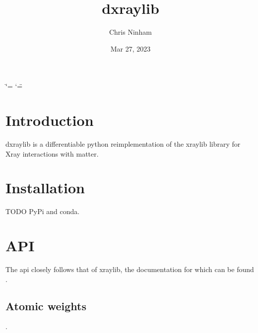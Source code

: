 \documentclass[letterpaper,10pt,english,openany,oneside]{sphinxmanual}
\title{dxraylib}
\date{Mar 27, 2023}
\author{Chris Ninham}
\begin{document}
\ifdefined\shorthandoff
  \ifnum\catcode`\=\string=\active\shorthandoff{=}\fi
  \ifnum\catcode`\"=\active{}\fi
\fi

\pagestyle{empty}
\sphinxmaketitle
\pagestyle{plain}
\sphinxtableofcontents
\pagestyle{normal}
\label{\detokenize{index::doc}}


\sphinxstepscope


\chapter{Introduction}
\label{\detokenize{introduction:introduction}}\label{\detokenize{introduction::doc}}
\sphinxAtStartPar
dxraylib is a differentiable python reimplementation of the xraylib library
for X\sphinxhyphen{}ray interactions with matter.

\sphinxstepscope


\chapter{Installation}
\label{\detokenize{install:installation}}\label{\detokenize{install::doc}}
\sphinxAtStartPar
TODO PyPi and conda.

\sphinxstepscope


\chapter{API}
\label{\detokenize{api:api}}\label{\detokenize{api::doc}}
\sphinxAtStartPar
The api closely follows that of xraylib, the documentation for which can be
found .

\sphinxstepscope


\section{Atomic weights}
\label{\detokenize{api/atomic_weights:atomic-weights}}\label{\detokenize{api/atomic_weights::doc}}
\sphinxAtStartPar
{}.
\end{document}
